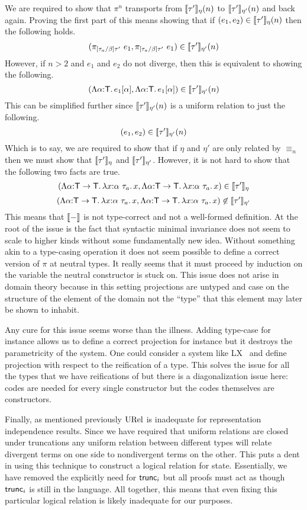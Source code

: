 We are required to show that $\pi^n$ transports from
$\llbracket \tau' \rrbracket_\eta(n)$ to $\llbracket \tau' \rrbracket_{\eta'}(n)$ and back again. Proving
the first part of this means showing that if
$(e_1, e_2) \in \llbracket \tau' \rrbracket_\eta(n)$ then the following holds.
\[
  (\pi_{[\tau_a/\beta]\tau'}\ e_1, \pi_{[\tau_a/\beta]\tau'}\ e_1)
  \in \llbracket \tau' \rrbracket_{\eta'}(n)
\]
However, if $n > 2$ and $e_1$ and $e_2$ do not diverge, then this is
equivalent to showing the following.
\[
  (\Lambda \alpha {:} \mathsf{T}.\, e_1[\alpha], \Lambda \alpha {:} \mathsf{T}.\, e_1[\alpha])
  \in \llbracket \tau' \rrbracket_{\eta'}(n)
\]
This can be simplified further since $\llbracket \tau' \rrbracket_{\eta'}(n)$ is a uniform
relation to just the following.
\[
  (e_1, e_2) \in \llbracket \tau' \rrbracket_{\eta'}(n)
\]
Which is to say, we are required to show that if $\eta$ and $\eta'$
are only related by $\equiv_n$ then we must show that
$\llbracket \tau' \rrbracket_{\eta}$ and $\llbracket \tau' \rrbracket_{\eta'}$. However, it is not
hard to show that the following two facts are true.
\[
  (\Lambda \alpha {:} \mathsf{T} \to \mathsf{T}.\, \lambda x {:} \alpha\ \tau_a.\, x,
   \Lambda \alpha {:} \mathsf{T} \to \mathsf{T}.\, \lambda x {:} \alpha\ \tau_a.\, x)
   \in \llbracket \tau' \rrbracket_\eta
\]
\[
  (\Lambda \alpha {:} \mathsf{T} \to \mathsf{T}.\, \lambda x {:} \alpha\ \tau_a.\, x,
   \Lambda \alpha {:} \mathsf{T} \to \mathsf{T}.\, \lambda x {:} \alpha\ \tau_a.\, x)
   \not\in \llbracket \tau' \rrbracket_{\eta'}
\]
This means that $\llbracket - \rrbracket$ is not type-correct and not a well-formed
definition. At the root of the issue is the fact that syntactic
minimal invariance does not seem to scale to higher kinds without some
fundamentally new idea. Without something akin to a type-casing
operation it does not seem possible to define a correct version of
$\pi$ at neutral types. It really seems that it must proceed by
induction on the variable the neutral constructor is stuck on. This
issue does not arise in domain theory because in this setting
projections are untyped and case on the structure of the element of
the domain not the ``type'' that this element may later be shown to
inhabit.

Any cure for this issue seems worse than the illness. Adding type-case
for instance allows us to define a correct projection for instance but
it destroys the parametricity of the system. One could consider a
system like LX~\citep{TODO-LX} and define projection with respect to
the reification of a type. This solves the issue for all the
types that we have reifications of but there is a diagonalization
issue here: codes are needed for every single constructor but the
codes themselves are constructors.

Finally, as mentioned previously $\mathrm{URel}$ is inadequate for
representation independence results. Since we have required that
uniform relations are closed under truncations any uniform relation
between different types will relate divergent terms on one side to
nondivergent terms on the other. This puts a dent in using this
technique to construct a logical relation for state. Essentially, we
have removed the explicitly need for $\mathsf{trunc}_i$ but all proofs must
act as though $\mathsf{trunc}_i$ is still in the language. All together, this
means that even fixing this particular logical relation is likely
inadequate for our purposes.

